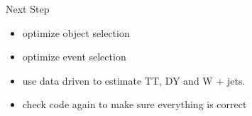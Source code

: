 \documentclass{beamer}
\begin{document}






\begin{frame}{Next Step}
    \begin{itemize}
    \item
       optimize object selection
    \item
        optimize event selection
    \item
        use data driven to estimate TT, DY and W + jets.
    \item
       check code again to make sure everything is correct
    \end{itemize}
\end{frame}
\end{document}
